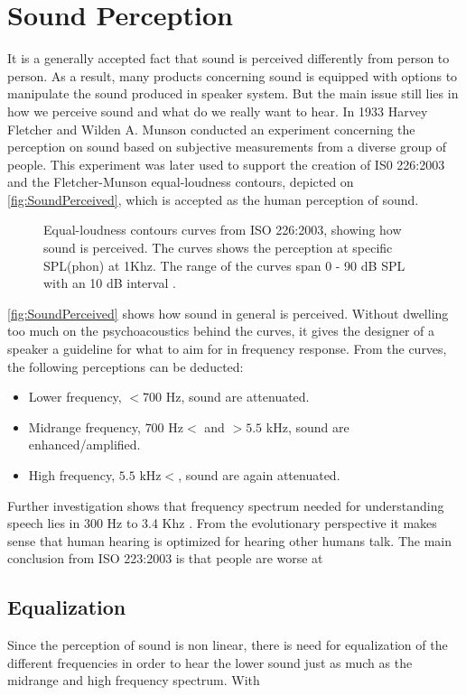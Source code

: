 \section{Sound Perception}

It is a generally accepted fact that sound is perceived differently from person to person. As a result, many products concerning sound is equipped with options to manipulate the sound produced in speaker system. But the main issue still lies in how we perceive sound and what do we really want to hear. In 1933 Harvey Fletcher and Wilden A. Munson conducted an experiment concerning the perception on sound based on subjective measurements from a diverse group of people. This experiment was later used to support the creation of IS0 226:2003 and the Fletcher-Munson equal-loudness contours, depicted on \autoref{fig:SoundPerceived}, which is accepted as the human perception of sound.

\begin{figure}[H]
\centering
{}

\caption{Equal-loudness contours curves from ISO 226:2003, showing how sound is perceived. The curves shows the perception at specific SPL(phon) at 1Khz. The range of the curves span 0 - 90 dB SPL with an 10 dB interval .}
\label{fig:SoundPerceived}
\end{figure}
\autoref{fig:SoundPerceived} shows how sound in general is perceived. Without dwelling too much on the psychoacoustics behind the curves, it gives the designer of a speaker a guideline for what to aim for in frequency response. From the curves, the following perceptions can be deducted:
\begin{itemize}
\item Lower frequency, $ < 700$ Hz, sound are attenuated.
\item Midrange frequency, $700 \text{ Hz} < $ and $ > 5.5$ kHz, sound are enhanced/amplified.
\item High frequency, $ 5.5 \text{ kHz} < $, sound are again attenuated.
\end{itemize}

Further investigation shows that frequency spectrum needed for understanding speech lies in 300 Hz to 3.4 Khz \citep{sou:VoiceFundamentals}. From the evolutionary perspective it makes sense that human hearing is optimized for hearing other humans talk. The main conclusion from ISO 223:2003 is that people are worse at 

\subsection{Equalization}
Since the perception of sound is non linear, there is need for equalization of the different frequencies in order to hear the lower sound just as much as the midrange and high frequency spectrum. With   


